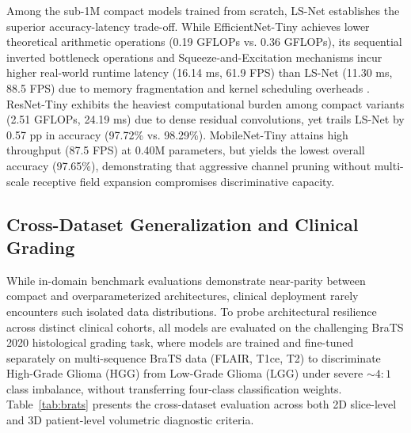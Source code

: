 Among the sub-1M compact models trained from scratch, LS-Net establishes the superior accuracy-latency trade-off. While EfficientNet-Tiny achieves lower theoretical arithmetic operations (0.19 GFLOPs vs. 0.36 GFLOPs), its sequential inverted bottleneck operations and Squeeze-and-Excitation mechanisms incur higher real-world runtime latency (16.14 ms, 61.9 FPS) than LS-Net (11.30 ms, 88.5 FPS) due to memory fragmentation and kernel scheduling overheads \cite{32}. ResNet-Tiny exhibits the heaviest computational burden among compact variants (2.51 GFLOPs, 24.19 ms) due to dense residual convolutions, yet trails LS-Net by 0.57 pp in accuracy (97.72\% vs. 98.29\%). MobileNet-Tiny attains high throughput (87.5 FPS) at 0.40M parameters, but yields the lowest overall accuracy (97.65\%), demonstrating that aggressive channel pruning without multi-scale receptive field expansion compromises discriminative capacity.

\subsection{Cross-Dataset Generalization and Clinical Grading}

While in-domain benchmark evaluations demonstrate near-parity between compact and overparameterized architectures, clinical deployment rarely encounters such isolated data distributions. To probe architectural resilience across distinct clinical cohorts, all models are evaluated on the challenging BraTS 2020 histological grading task, where models are trained and fine-tuned separately on multi-sequence BraTS data (FLAIR, T1ce, T2) to discriminate High-Grade Glioma (HGG) from Low-Grade Glioma (LGG) under severe $\sim 4:1$ class imbalance, without transferring four-class classification weights. Table~\ref{tab:brats} presents the cross-dataset evaluation across both 2D slice-level and 3D patient-level volumetric diagnostic criteria.

